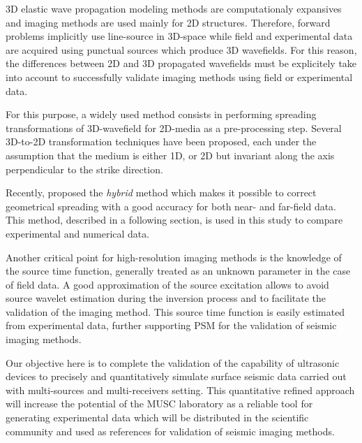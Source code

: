 \documentclass[manuscript,revised]{geophysics}
\begin{document}

\noindent 3D elastic wave propagation modeling methods are computationaly expansives and imaging methods are used mainly for 2D structures. Therefore, forward problems implicitly use line-source in 3D-space while field and experimental data are acquired using punctual sources which produce 3D wavefields. For this reason, the differences between 2D and 3D propagated wavefields must be explicitely take into account to successfully validate imaging methods using field or experimental data. 


\noindent For this purpose, a widely used method consists in performing spreading transformations of 3D-wavefield for 2D-media as a pre-processing step. Several 3D-to-2D transformation techniques have been proposed, each under the assumption that the medium is either 1D, or 2D but invariant along the axis perpendicular to the strike direction.

\noindent Recently, \citet{Forbriger_LSS_2014} proposed the \textit{hybrid} method which makes it possible to correct geometrical spreading with a good accuracy for both near- and far-field data. This method, described in a following section, is used in this study to compare experimental and numerical data. 

\noindent Another critical point for high-resolution imaging methods is the knowledge of the source time function, generally treated as an unknown parameter in the case of field data. A good approximation of the source excitation allows to avoid source wavelet estimation during the inversion process and to facilitate the validation of the imaging method. This source time function is easily estimated from experimental data, further supporting PSM for the validation of seismic imaging methods.

\noindent Our objective here is to complete the validation of the capability of ultrasonic devices to precisely and quantitatively simulate surface seismic data carried out with multi-sources and multi-receivers setting. This quantitative refined approach will increase the potential of the MUSC laboratory as a reliable tool for generating experimental data which will be distributed in the scientific community and used as references for validation of seismic imaging methods.
\end{document}
